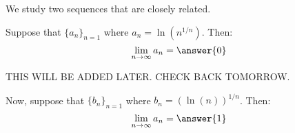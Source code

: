 \documentclass{ximera}
\author{Jim Talamo}
\begin{document}
\begin{exercise}
 We study two sequences that are closely related. 
 
Suppose that $\{a_n \}_{n=1}$ where $a_n = \ln\left(n^{1/n}\right)$.  Then:
\[
\lim_{n \to \infty} a_n = \answer{0}
\]

\begin{hint}
THIS WILL BE ADDED LATER.  CHECK BACK TOMORROW.
\end{hint}

Now, suppose that $\{b_n \}_{n=1}$ where $b_n = (\ln(n))^{1/n}$.  Then:
\[
\lim_{n \to \infty} a_n = \answer{1}
\]


\end{exercise}
\end{document}
